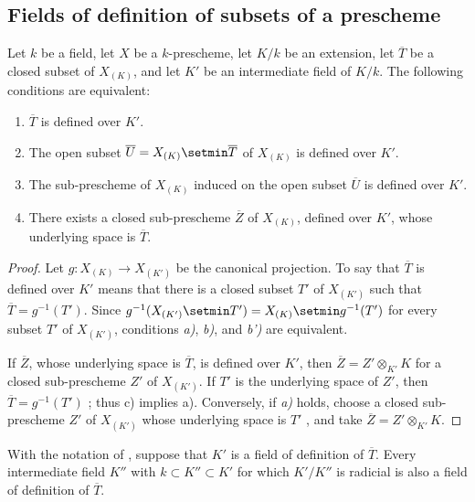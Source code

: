 \subsection{Fields of definition of subsets of a prescheme}
\label{subsection:IV.4.9}

\begin{proposition}[4.9.1]
\label{IV.4.9.1}
Let $k$ be a field, let $X$ be a $k$-prescheme, let $K/k$ be an
extension, let $\overline T$ be a closed subset of $X_{(K)}$, and let
$K'$ be an intermediate field of $K/k$.
The following conditions are equivalent:
\begin{enumerate}
\item[\rm(a)]
\label{IV.4.9.1.a}
$\overline T$ is defined over $K'$.
\item[\rm(b)]
\label{IV.4.9.1.b}
The open subset $\overline U=X_{(K)}\setmin\overline T$ of $X_{(K)}$ is
defined over $K'$.
\item[\rm(b$'$)]
\label{IV.4.9.1.bprime}
The sub-prescheme of $X_{(K)}$ induced on the open subset
$\overline U$ is defined over $K'$.
\item[\rm(c)]
\label{IV.4.9.1.c}
There exists a closed sub-prescheme $\overline Z$ of $X_{(K)}$,
defined over $K'$, whose underlying space is $\overline T$.
\end{enumerate}
\end{proposition}

\begin{proof}
Let $g:X_{(K)}\to X_{(K')}$ be the canonical projection.
To say that $\overline T$ is defined over $K'$ means that there is a
closed subset $T'$ of $X_{(K')}$ such that
$\overline T=g^{-1}(T')$.
Since $g^{-1}(X_{(K')}\setmin T')=X_{(K)}\setmin g^{-1}(T')$
for every subset $T'$ of $X_{(K')}$, conditions
\emph{a)}, \emph{b)}, and
\emph{b')} are equivalent.

If $\overline Z$, whose underlying space is $\overline T$, is defined
over $K'$, then $\overline Z=Z'\otimes_{K'}K$
for a closed sub-prescheme $Z'$ of $X_{(K')}$.
If $T'$ is the underlying space of $Z'$, then
$\overline T=g^{-1}(T')$ ; thus
\textup{c)} implies \textup{a)}.
Conversely, if \emph{a)} holds, choose a closed sub-prescheme
$Z'$ of $X_{(K')}$ whose underlying space is $T'$
, and take
$\overline Z=Z'\otimes_{K'}K$.
\end{proof}

\begin{corollary}[4.9.2]
\label{IV.4.9.2}
With the notation of , suppose that $K'$ is a field
of definition of $\overline T$.
Every intermediate field $K''$ with $k\subset K''\subset K'$ for
which $K'/K''$ is radicial is also a field of definition of
$\overline T$.
\end{corollary}

